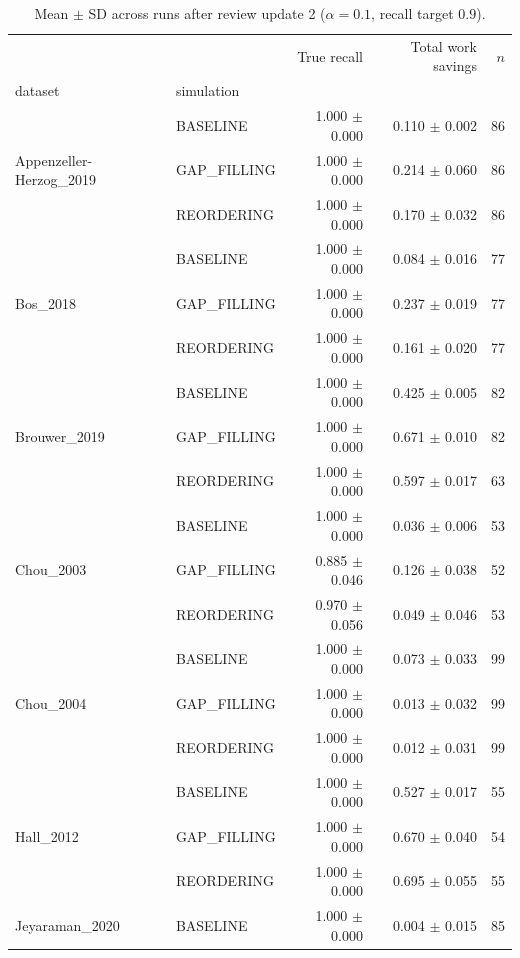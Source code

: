 \begin{table}[htbp]
\caption{Mean $\pm$ SD across runs after review update 2 ($\alpha=0.1$, recall target $0.9$).}
\label{tab:results-a0.1-r0.9}
\begin{tabular}{llrrr}
\toprule
 &  & True recall & Total work savings & $n$ \\
dataset & simulation &  &  &  \\
\midrule
\multirow[t]{3}{*}{Appenzeller-Herzog_2019} & BASELINE & 1.000 $\pm$ 0.000 & 0.110 $\pm$ 0.002 & 86 \\
 & GAP_FILLING & 1.000 $\pm$ 0.000 & 0.214 $\pm$ 0.060 & 86 \\
 & REORDERING & 1.000 $\pm$ 0.000 & 0.170 $\pm$ 0.032 & 86 \\
\cline{1-5}
\multirow[t]{3}{*}{Bos_2018} & BASELINE & 1.000 $\pm$ 0.000 & 0.084 $\pm$ 0.016 & 77 \\
 & GAP_FILLING & 1.000 $\pm$ 0.000 & 0.237 $\pm$ 0.019 & 77 \\
 & REORDERING & 1.000 $\pm$ 0.000 & 0.161 $\pm$ 0.020 & 77 \\
\cline{1-5}
\multirow[t]{3}{*}{Brouwer_2019} & BASELINE & 1.000 $\pm$ 0.000 & 0.425 $\pm$ 0.005 & 82 \\
 & GAP_FILLING & 1.000 $\pm$ 0.000 & 0.671 $\pm$ 0.010 & 82 \\
 & REORDERING & 1.000 $\pm$ 0.000 & 0.597 $\pm$ 0.017 & 63 \\
\cline{1-5}
\multirow[t]{3}{*}{Chou_2003} & BASELINE & 1.000 $\pm$ 0.000 & 0.036 $\pm$ 0.006 & 53 \\
 & GAP_FILLING & 0.885 $\pm$ 0.046 & 0.126 $\pm$ 0.038 & 52 \\
 & REORDERING & 0.970 $\pm$ 0.056 & 0.049 $\pm$ 0.046 & 53 \\
\cline{1-5}
\multirow[t]{3}{*}{Chou_2004} & BASELINE & 1.000 $\pm$ 0.000 & 0.073 $\pm$ 0.033 & 99 \\
 & GAP_FILLING & 1.000 $\pm$ 0.000 & 0.013 $\pm$ 0.032 & 99 \\
 & REORDERING & 1.000 $\pm$ 0.000 & 0.012 $\pm$ 0.031 & 99 \\
\cline{1-5}
\multirow[t]{3}{*}{Hall_2012} & BASELINE & 1.000 $\pm$ 0.000 & 0.527 $\pm$ 0.017 & 55 \\
 & GAP_FILLING & 1.000 $\pm$ 0.000 & 0.670 $\pm$ 0.040 & 54 \\
 & REORDERING & 1.000 $\pm$ 0.000 & 0.695 $\pm$ 0.055 & 55 \\
\cline{1-5}
\multirow[t]{3}{*}{Jeyaraman_2020} & BASELINE & 1.000 $\pm$ 0.000 & 0.004 $\pm$ 0.015 & 85 \\

\end{tabular}
\end{table}

